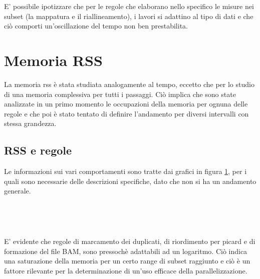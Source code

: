 E' possibile ipotizzare che per le regole che elaborano nello specifico le misure nei subset (la mappatura e il riallineamento), i lavori si adattino al tipo di dati e che ciò comporti un'oscillazione del tempo non ben prestabilita.

\section{Memoria RSS}
La memoria rss è stata studiata analogamente al tempo, eccetto che per lo studio di una memoria complessiva per tutti i passaggi. 
Ciò implica che sono state analizzate in un primo momento le occupazioni della memoria per ognuna delle regole e che poi è stato tentato di definire l'andamento per diversi intervalli con stessa grandezza. 

\subsection{RSS e regole}
Le informazioni sui vari comportamenti sono tratte dai grafici in figura \ref{fig:RSSr}, per i quali sono necessarie delle descrizioni specifiche, dato che non si ha un andamento generale. 
\begin{figure}[H]
\centering
{} \quad
{} \\
\end{figure}
\begin{figure}[H]
\ContinuedFloat
\centering
{} \quad
{} \\
\end{figure}
\begin{figure}[H]
\ContinuedFloat
\centering
{} 
\caption{}
\label{fig:RSSr}
\end{figure}

E' evidente che regole di marcamento dei duplicati, di riordimento per picard e di formazione del file BAM, sono pressochè adattabili ad un logaritmo. 
Ciò indica una saturazione della memoria per un certo range di subset raggiunto e ciò è un fattore rilevante per la determinazione di un'uso efficace della parallelizzazione.

